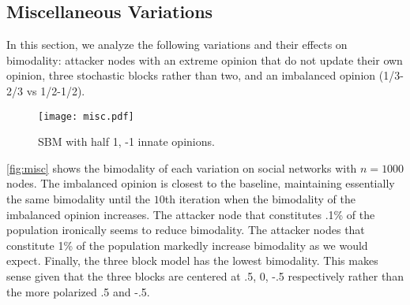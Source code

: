 \subsection{Miscellaneous Variations}

In this section, we analyze the following variations and 
their effects on bimodality:
attacker nodes with an extreme opinion that do not update
their own opinion, three stochastic blocks rather than two,
and an imbalanced opinion (1/3-2/3 vs 1/2-1/2).

\begin{figure}[h]
    \centering
    \texttt{[image: misc.pdf]}
    \caption{SBM with half 1, -1 innate opinions.}
    \label{fig:misc}
\end{figure}

\autoref{fig:misc} shows the bimodality of each variation
on social networks with $n=1000$ nodes.
The imbalanced opinion is closest to the baseline,
maintaining essentially the same bimodality until the $10$th
iteration when the bimodality of the imbalanced opinion increases.
The attacker node that constitutes .1\% of the population
ironically seems to reduce bimodality.
The attacker nodes that constitute 1\% of the population
markedly increase bimodality as we would expect.
Finally, the three block model has the lowest bimodality.
This makes sense given that the three blocks are centered
at .5, 0, -.5 respectively rather than the more polarized
.5 and -.5.

